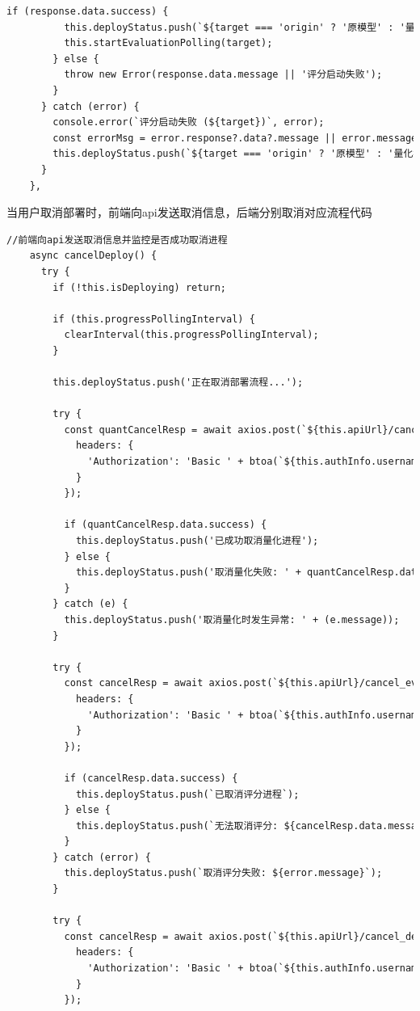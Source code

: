 \documentclass[AutoFakeBold,AutoFakeSlant,language=chinese,degree=bachelor]{sustechthesis}
\begin{document}
\begin{itemize}
\begin{lstlisting}[language=HTML]
        if (response.data.success) {
          this.deployStatus.push(`${target === 'origin' ? '原模型' : '量化模型'} 评分任务已启动`);
          this.startEvaluationPolling(target);
        } else {
          throw new Error(response.data.message || '评分启动失败');
        }
      } catch (error) {
        console.error(`评分启动失败 (${target})`, error);
        const errorMsg = error.response?.data?.message || error.message;
        this.deployStatus.push(`${target === 'origin' ? '原模型' : '量化模型'} 评分启动失败: ${error.message}`);
      }
    },
    \end{lstlisting}
    当用户取消部署时，前端向api发送取消信息，后端分别取消对应流程代码
    \begin{lstlisting}[language=HTML]
    //前端向api发送取消信息并监控是否成功取消进程
    async cancelDeploy() {
      try {
        if (!this.isDeploying) return;

        if (this.progressPollingInterval) {
          clearInterval(this.progressPollingInterval);
        }

        this.deployStatus.push('正在取消部署流程...');

        try {
          const quantCancelResp = await axios.post(`${this.apiUrl}/cancel_quant`, {}, {
            headers: {
              'Authorization': 'Basic ' + btoa(`${this.authInfo.username}:${this.authInfo.password}`)
            }
          });

          if (quantCancelResp.data.success) {
            this.deployStatus.push('已成功取消量化进程');
          } else {
            this.deployStatus.push('取消量化失败: ' + quantCancelResp.data.message);
          }
        } catch (e) {
          this.deployStatus.push('取消量化时发生异常: ' + (e.message));
        }

        try {
          const cancelResp = await axios.post(`${this.apiUrl}/cancel_eval`, {}, {
            headers: {
              'Authorization': 'Basic ' + btoa(`${this.authInfo.username}:${this.authInfo.password}`)
            }
          });

          if (cancelResp.data.success) {
            this.deployStatus.push(`已取消评分进程`);
          } else {
            this.deployStatus.push(`无法取消评分: ${cancelResp.data.message}`);
          }
        } catch (error) {
          this.deployStatus.push(`取消评分失败: ${error.message}`);
        }

        try {
          const cancelResp = await axios.post(`${this.apiUrl}/cancel_deployment`, {}, {
            headers: {
              'Authorization': 'Basic ' + btoa(`${this.authInfo.username}:${this.authInfo.password}`)
            }
          });


\end{lstlisting}
\end{itemize}
\end{document}
